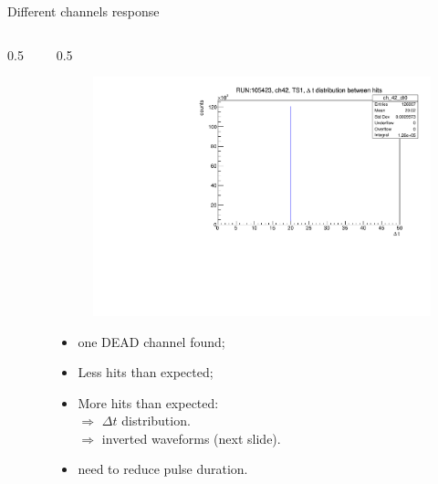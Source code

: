 \documentclass{beamer}[10pt]
\begin{document}
\begin{frame}{Different channels response}
\begin{columns}
\begin{column}{0.5\framewidth}
\begin{figure}[H]
   \label{fig:wfgkgnvjkhl}
 \end{figure}
\end{column}
\begin{column}{0.5\framewidth}
\begin{figure}[H]
   \centering
   \includegraphics[width= .90\columnwidth]{figures/pdf/deltat.pdf}
   \label{fig:wfgkgnvjkhl}
 \end{figure}

\begin{itemize}
\item one DEAD channel found;
\item Less hits than expected;
\item More hits than expected:
\\
$\Rightarrow$ $\Delta t$ distribution.
\\
$\Rightarrow$ inverted waveforms (next slide).
\item need to reduce pulse duration.
\end{itemize}
\end{column}
\end{columns}



\end{frame}
\end{document}
